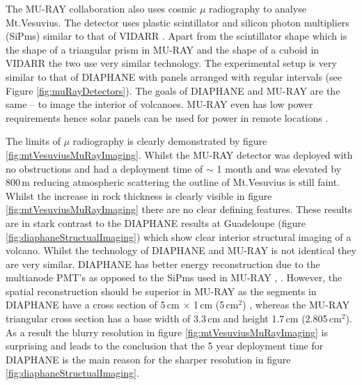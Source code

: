The MU-RAY collaboration also uses cosmic $\mu$ radiography to analyse Mt.Vesuvius. The detector uses plastic scintillator and silicon photon multipliers (SiPms) similar to that of VIDARR \cite{ANASTASIO2013423} \cite{Ambrosino_2014}. Apart from the scintillator shape which is the shape of a triangular prism in MU-RAY and the shape of a cuboid in VIDARR the two use very similar technology. The experimental setup is very similar to that of DIAPHANE with panels arranged with regular intervals (see Figure \ref{fig:muRayDetectors}). The goals of DIAPHANE and MU-RAY are the same -- to image the interior of volcanoes. MU-RAY even has low power requirements hence solar panels can be used for power in remote locations \cite{ANASTASIO2013423}. 


The limits of $\mu$ radiography is clearly demonstrated by figure \ref{fig:mtVesuviusMuRayImaging}. Whilst the MU-RAY detector was deployed with no obstructions and had a deployment time of $\sim$ 1 month and was elevated by 800\,m reducing atmospheric scattering the outline of Mt.Vesuvius is still faint. Whilst the increase in rock thickness is clearly visible in figure \ref{fig:mtVesuviusMuRayImaging} there are no clear defining features. These results are in stark contrast to the DIAPHANE results at Guadeloupe (figure \ref{fig:diaphaneStructualImaging}) which show clear interior structural imaging of a volcano. Whilst the technology of DIAPHANE and MU-RAY is not identical they are very similar. DIAPHANE has better energy reconstruction due to the multianode PMT’s as opposed to the SiPms used in MU-RAY \cite{Marteau_2017}, \cite{ANASTASIO2013423}. However, the spatial reconstruction should be superior in MU-RAY as the segments in DIAPHANE have a cross section of 5\,cm $\times$ 1\,cm (5\,cm$^2$) \cite{MARTEAU201223}, whereas the MU-RAY triangular cross section has a base width of 3.3\,cm and height 1.7\,cm (2.805\,cm$^2$). As a result the blurry resolution in figure \ref{fig:mtVesuviusMuRayImaging} is surprising and leads to the conclusion that the 5 year deployment time for DIAPHANE is the main reason for the sharper resolution in figure \ref{fig:diaphaneStructualImaging}.

